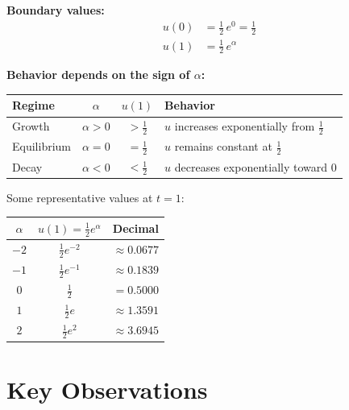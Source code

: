 \documentclass[11pt]{article}
\begin{document}
\medskip
\noindent
\textbf{Boundary values:}
\begin{align}
  u(0) &= \tfrac{1}{2}\,e^0 = \tfrac{1}{2} \\[6pt]
  u(1) &= \tfrac{1}{2}\,e^{\alpha}
\end{align}

\medskip
\noindent
\textbf{Behavior depends on the sign of $\alpha$:}

\begin{center}
\renewcommand{\arraystretch}{1.5}
\begin{tabular}{l|c|c|l}
  \hline
  \textbf{Regime} & $\alpha$ & $u(1)$ & \textbf{Behavior} \\
  \hline
  Growth    & $\alpha > 0$ & $> \frac{1}{2}$ & $u$ increases exponentially from $\frac{1}{2}$ \\
  Equilibrium & $\alpha = 0$ & $= \frac{1}{2}$ & $u$ remains constant at $\frac{1}{2}$ \\
  Decay     & $\alpha < 0$ & $< \frac{1}{2}$ & $u$ decreases exponentially toward $0$ \\
  \hline
\end{tabular}
\end{center}

\medskip
\noindent
Some representative values at $t = 1$:

\begin{center}
\renewcommand{\arraystretch}{1.4}
\begin{tabular}{c|c|c}
  \hline
  $\alpha$ & $u(1) = \frac{1}{2}e^{\alpha}$ & Decimal \\
  \hline
  $-2$  & $\frac{1}{2}e^{-2}$  & $\approx 0.0677$ \\
  $-1$  & $\frac{1}{2}e^{-1}$  & $\approx 0.1839$ \\
  $0$   & $\frac{1}{2}$        & $= 0.5000$ \\
  $1$   & $\frac{1}{2}e$       & $\approx 1.3591$ \\
  $2$   & $\frac{1}{2}e^{2}$   & $\approx 3.6945$ \\
  \hline
\end{tabular}
\end{center}

\section{Key Observations}
\end{document}
